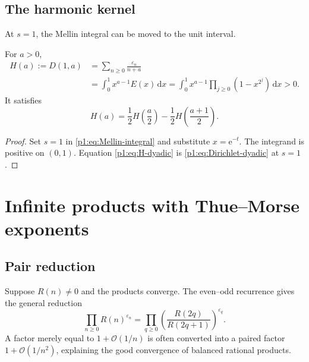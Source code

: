 \documentclass[11pt,oneside]{article}
\numberwithin{equation}{section}
\theoremstyle{definition}
\theoremstyle{remark}
\newcommand{\e}{\mathrm e}
\newcommand{\dd}{\,\mathrm d}
\newcommand{\bigO}{\mathcal O}
\newcommand{\eps}{\varepsilon}
\begin{document}
\subsection{The harmonic kernel}

At \(s=1\), the Mellin integral can be moved to the unit interval.

\begin{corollary}
\label{p1:cor:harmonic-integral}
For \(a>0\),
\begin{align}
  H(a):=D(1,a)
  &=\sum_{n\ge0}\frac{\eps_n}{n+a}
  \label{p1:eq:H-definition}\\
  &=\boxed{
  \int_0^1x^{a-1}E(x)\dd x
  =\int_0^1x^{a-1}
    \prod_{j\ge0}(1-x^{2^j})\dd x}>0.
  \label{p1:eq:H-integral}
\end{align}
It satisfies
\begin{equation}
  \boxed{
  H(a)=\frac12H\!\left(\frac a2\right)
       -\frac12H\!\left(\frac{a+1}{2}\right).}
  \label{p1:eq:H-dyadic}
\end{equation}
\end{corollary}

\begin{proof}
Set \(s=1\) in \eqref{p1:eq:Mellin-integral} and substitute \(x=\e^{-t}\).
The integrand is positive on \((0,1)\).  Equation \eqref{p1:eq:H-dyadic} is
\eqref{p1:eq:Dirichlet-dyadic} at \(s=1\).
\end{proof}

\section[Thue--Morse exponent products]{Infinite products with Thue--Morse exponents}
\label{p1:sec:exponent-products}

\subsection{Pair reduction}

Suppose \(R(n)\ne0\) and the products converge.  The even--odd recurrence
gives the general reduction
\begin{equation}
  \boxed{
  \prod_{n\ge0}R(n)^{\eps_n}
  =\prod_{q\ge0}
    \left(\frac{R(2q)}{R(2q+1)}\right)^{\eps_q}.}
  \label{p1:eq:pair-reduction}
\end{equation}
A factor merely equal to \(1+\bigO(1/n)\) is often converted into a paired
factor \(1+\bigO(1/n^2)\), explaining the good convergence of balanced
rational products.
\end{document}
